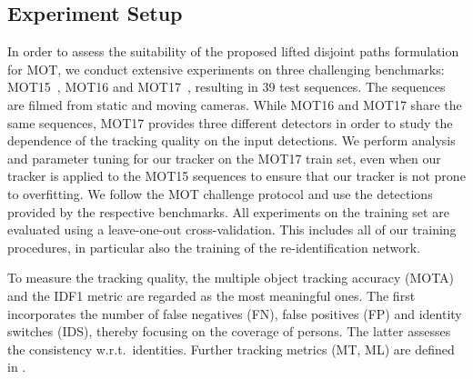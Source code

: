 \documentclass{article}
\begin{document}
\subsection{Experiment Setup}
In order to assess the suitability of the proposed lifted disjoint paths formulation for MOT, we conduct extensive experiments on three challenging benchmarks: MOT15~\cite{MOTChallenge2015}, MOT16 and MOT17~\cite{MOT16}, resulting in 39 test sequences. The sequences are filmed from static and moving cameras. While MOT16 and MOT17 share the same sequences, MOT17 provides three different detectors in order to study the dependence of the tracking quality on the input detections. 
We perform analysis and parameter tuning for our tracker on the MOT17 train set, even when our tracker is applied to the MOT15 sequences to ensure that our tracker is not prone to overfitting. 
We follow the MOT challenge protocol and use the detections provided by the respective benchmarks. 
All experiments on the training set are evaluated using a leave-one-out cross-validation. This includes all of our training procedures,  in particular also the training of the re-identification  network. 

To measure the tracking quality, the multiple object tracking accuracy (MOTA) \cite{bernardin2008evaluating} and the IDF1 metric \cite{ristani2016MTMC} are regarded as the most meaningful ones. The first incorporates the number of false negatives (FN), false positives (FP) and identity switches (IDS), thereby focusing on the coverage of persons. The latter assesses the consistency w.r.t.\ identities. Further tracking metrics (MT, ML) are defined in \cite{li2009learning}. 
\end{document}
